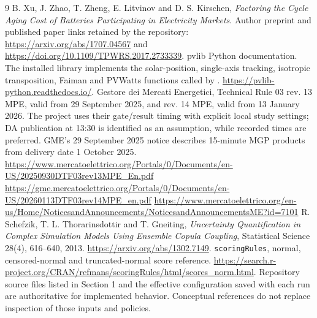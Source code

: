 \documentclass[11pt,a4paper]{article}
\begin{document}
\begin{thebibliography}{9}
\small
{} B. Xu, J. Zhao, T. Zheng, E. Litvinov and D. S. Kirschen,
\emph{Factoring the Cycle Aging Cost of Batteries Participating in Electricity
Markets}. Author preprint and published paper links retained by the repository:
\url{https://arxiv.org/abs/1707.04567} and
\url{https://doi.org/10.1109/TPWRS.2017.2733339}.
 pvlib Python documentation. The installed library implements the
solar-position, single-axis tracking, isotropic transposition, Faiman and PVWatts
functions called by .
\url{https://pvlib-python.readthedocs.io/}.
 Gestore dei Mercati Energetici, Technical Rule 03 rev. 13 MPE,
valid from 29 September 2025, and rev. 14 MPE, valid from 13 January 2026.
The project uses their gate/result timing with explicit local study settings;
DA publication at 13:30 is identified as an assumption, while recorded times
are preferred. GME's 29 September 2025 notice describes 15-minute MGP products
from delivery date 1 October 2025.
\url{https://www.mercatoelettrico.org/Portals/0/Documents/en-US/20250930DTF03rev13MPE_En.pdf}
\url{https://gme.mercatoelettrico.org/Portals/0/Documents/en-US/20260113DTF03rev14MPE_en.pdf}
\url{https://www.mercatoelettrico.org/en-us/Home/NoticesandAnnouncements/NoticesandAnnouncementsME?id=7101}
 R. Schefzik, T. L. Thorarinsdottir and T. Gneiting,
\emph{Uncertainty Quantification in Complex Simulation Models Using Ensemble
Copula Coupling}, Statistical Science 28(4), 616--640, 2013.
\url{https://arxiv.org/abs/1302.7149}.
 \texttt{scoringRules}, normal, censored-normal and
truncated-normal score reference.
\url{https://search.r-project.org/CRAN/refmans/scoringRules/html/scores_norm.html}.
 Repository source files listed in Section 1 and the effective
configuration saved with each run are authoritative for implemented behavior.
Conceptual references do not replace inspection of those inputs and policies.
\end{thebibliography}
\end{document}
